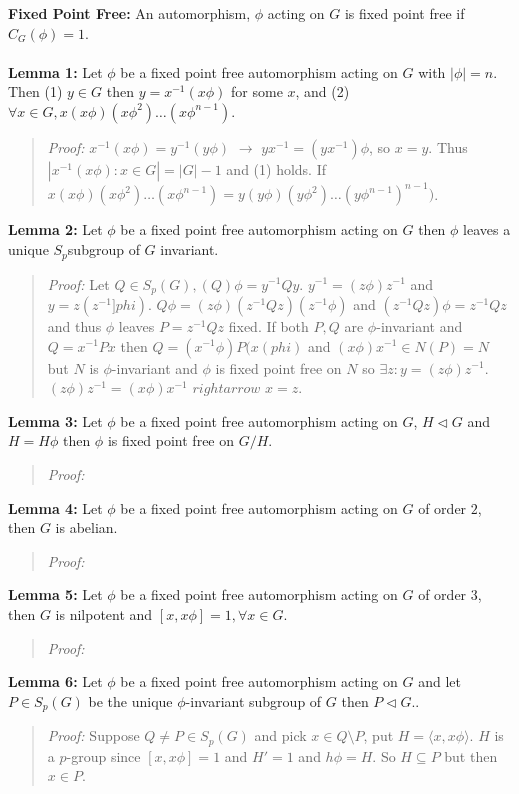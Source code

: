 {\bf Fixed Point Free:}  An automorphism, $\phi$ acting on $G$ is fixed point free if $C_G(\phi) =1$.
\\
\\
{\bf Lemma 1:} Let $\phi$ be a fixed point free automorphism acting on $G$ with $|\phi|=n$.  Then
(1) $y \in G$ then $y= x^{-1}(x \phi)$ for some $x$, and 
(2) $\forall x \in G, x(x \phi) (x \phi^2) \ldots (x \phi^{n-1})$.
\begin{quote}
\emph{Proof:}  
$x^{-1}(x\phi) = y^{-1}(y\phi)$ $\rightarrow$ $y x^{-1} = (y x^{-1})\phi$, so $x=y$.  Thus
$|{x^{-1}(x\phi): x \in G}| = |G|-1$ and (1) holds. If
$x(x \phi) (x \phi^2) \ldots (x \phi^{n-1}) =
y(y \phi) (y \phi^2) \ldots (y \phi^{n-1})^{n-1})$.
\end{quote}
{\bf Lemma 2:} Let $\phi$ be a fixed point free automorphism acting on $G$ then $\phi$ leaves a unique
$S_p$subgroup of $G$ invariant.
\begin{quote}
\emph{Proof:}  
Let $Q \in S_p(G), (Q)\phi = y^{-1}Qy$.  $y^{-1}= (z\phi)z^{-1}$ and $y = z(z^{-1}]phi)$.
$Q\phi = (z\phi) (z^{-1}Q z) (z^{-1}\phi)$ and $(z^{-1}Qz)\phi= z^{-1}Qz$ and thus
$\phi$ leaves $P=z^{-1}Qz$ fixed.  If both $P, Q$ are $\phi$-invariant and 
$Q=x^{-1}Px$ then
$Q=(x^{-1}\phi)P(x(phi)$ and $(x\phi)x^{-1} \in N(P) = N$ but $N$ is $\phi$-invariant and
$\phi$ is fixed point free on $N$ so $\exists z: y=(z\phi)z^{-1}$.
$(z\phi)z^{-1}=
(x\phi)x^{-1}$ $rightarrow$ $x=z$.
\end{quote}
{\bf Lemma 3:} Let $\phi$ be a fixed point free automorphism acting on $G$, $H \lhd G$ and $H= H\phi$ then
$\phi$ is fixed point free on $G/H$.
\begin{quote}
\emph{Proof:}  
\end{quote}
{\bf Lemma 4:} Let $\phi$ be a fixed point free automorphism acting on $G$ of order $2$, then $G$ is abelian.
\begin{quote}
\emph{Proof:}  
\end{quote}
{\bf Lemma 5:} Let $\phi$ be a fixed point free automorphism acting on $G$ of order $3$, then $G$ is
nilpotent and $[x, x\phi]=1, \forall x \in G$.
\begin{quote}
\emph{Proof:}  
\end{quote}
{\bf Lemma 6:} Let $\phi$ be a fixed point free automorphism acting on $G$ and let $P \in S_p(G)$ be the
unique $\phi$-invariant subgroup of $G$ then $P \lhd G$..
\begin{quote}
\emph{Proof:}  
Suppose $Q \ne P \in S_p(G)$ and pick $x \in Q \setminus P$, put $H=\langle x, x\phi \rangle$.
$H$ is a $p$-group since $[x, x\phi]=1$ and $H'=1$ and $h \phi = H$.  So $H \subseteq P$ but then
$x \in P$.
\end{quote}

